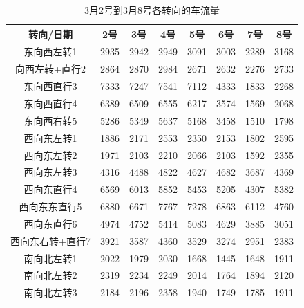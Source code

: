 \documentclass[UTF8]{article}
\begin{document}
    \begin{table}[H]
        \centering
        \caption{3月2号到3月8号各转向的车流量}
        \begin{tabular}{cccccccc}
           \hline
            转向/日期 & 2号 & 3号 & 4号 & 5号 & 6号 & 7号 & 8号 \\
           \hline
            东向西左转1	& 2935	&2942	&2949	&3091	&3003	&2289	&3168\\
           
            向西左转+直行2	&2864 &2870	&2984	&2671	&2632	&2276	&2733\\
           
            东向西直行3	&7333	&7247	&7541	&7112	&4333	&1833	&2268\\
           
            东向西直行4	&6389	&6509	&6555	&6217	&3574	&1569	&2068\\
           
            东向西右转5	&5286	&5349	&5637	&5168	&3458	&1510	&1798\\
           
            西向东左转1	&1886	&2171	&2553	&2350	&2153	&1802	&2595\\
           
            西向东左转2	&1971	&2103	&2210	&2066	&2103	&1592	&2355\\
           
            西向东左转3	&4316	&4488	&4822	&4627	&4682	&3687	&4369\\
           
            西向东直行4	&6569	&6013	&5852	&5453	&5205	&4307	&5382\\
           
            西向东东直行5	&6880	&6671	&7767	&7278	&6863	&6112	&4760\\
           
            西向东直行6	&4974	&4752	&5414	&5083	&4629	&3885	&3051\\
           
            西向东右转+直行7	&3921	&3587	&4360	&3529	&3274	&2951	&2383\\
           
            南向北左转1	&2022	&1979	&2030	&1668	&1445	&1648	&1911\\
           
            南向北左转2	&2319	&2234	&2249	&2014	&1764	&1894	&2120\\
           
            南向北左转3	&2184	&2196	&2358	&1940	&1749	&1785	&1911\\
           

\end{tabular}
\end{table}
\end{document}
